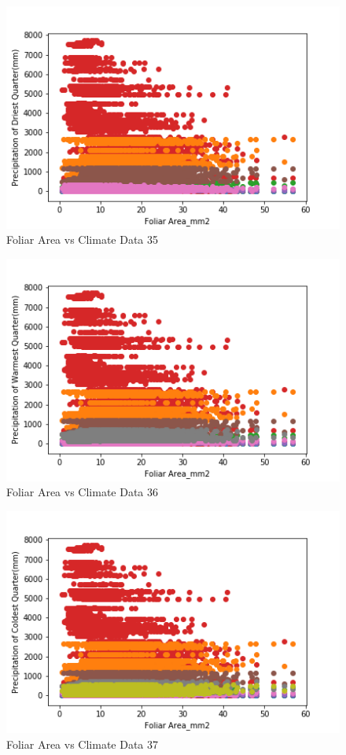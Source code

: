 \documentclass[letterpaper]{article}
\begin{document}
\begin{figure}[h]
\caption{Foliar Area vs Climate Data 35\label{fig:Foliar_Area_vs_35}}
\centering
\includegraphics[width=0.7\paperwidth]{Foliar_Area_vs_35}
\end{figure}


\begin{figure}[h]
\caption{Foliar Area vs Climate Data 36\label{fig:Foliar_Area_vs_36}}
\centering
\includegraphics[width=0.7\paperwidth]{Foliar_Area_vs_36}
\end{figure}


\begin{figure}[h]
\caption{Foliar Area vs Climate Data 37\label{fig:Foliar_Area_vs_37}}
\centering
\includegraphics[width=0.7\paperwidth]{Foliar_Area_vs_37}
\end{figure}
\end{document}
